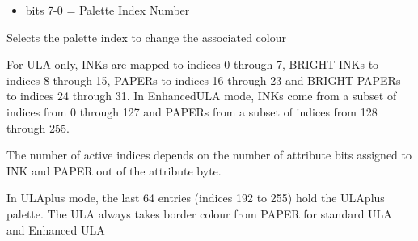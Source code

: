 \begin{itemize}
\item bits 7-0 = Palette Index Number
\end{itemize}
Selects the palette index to change the associated colour

For ULA only, INKs are mapped to indices 0 through 7, BRIGHT INKs to
indices 8 through 15, PAPERs to indices 16 through 23 and BRIGHT
PAPERs to indices 24 through 31.  In EnhancedULA mode, INKs come from
a subset of indices from 0 through 127 and PAPERs from a subset of
indices from 128 through 255.

The number of active indices depends on the number of attribute bits
assigned to INK and PAPER out of the attribute byte.

In ULAplus mode, the last 64 entries (indices 192 to 255) hold the
ULAplus palette.  The ULA always takes border colour from PAPER for
standard ULA and Enhanced ULA


